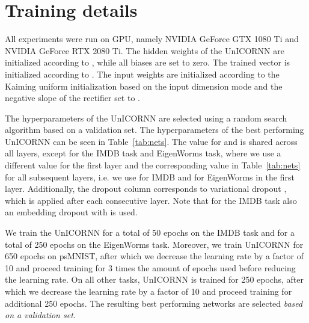 \documentclass{article}
\newcommand{\Tref}[1]{Table~\ref{#1}}
\begin{document}
\onecolumn
{}
\appendix

\setcounter{equation}{0}
\section{Training details}
All experiments were run on GPU, namely NVIDIA GeForce GTX 1080 Ti and NVIDIA GeForce RTX 2080 Ti. The hidden weights  of the UnICORNN are initialized according to  , while all biases are set to zero. The trained vector  is initialized according to . The input weights  are initialized according to the Kaiming uniform initialization \citep{kaiming} based on the input dimension mode and the negative slope of the rectifier set to .

The hyperparameters of the UnICORNN are selected using a random search algorithm based on a validation set. The hyperparameters of the best performing UnICORNN can be seen in \Tref{tab:nets}. The value for  and  is shared across all layers, except for the IMDB task and EigenWorms task, where we use a different  value for the first layer and the corresponding  value in \Tref{tab:nets} for all subsequent layers, i.e. we use  for IMDB and  for EigenWorms in the first layer. 
Additionally, the dropout column corresponds to variational dropout \citep{gal}, which is applied after each consecutive layer. Note that for the IMDB task also an embedding dropout with  is used.

We train the UnICORNN for a total of 50 epochs on the IMDB task and for a total of 250 epochs on the EigenWorms task. Moreover, we train UnICORNN for 650 epochs on psMNIST, after which we decrease the learning rate by a factor of 10 and proceed training for 3 times the amount of epochs used before reducing the learning rate. On all other tasks, UnICORNN is trained for 250 epochs, after which we decrease the learning rate by a factor of 10 and proceed training for additional 250 epochs.
The resulting best performing networks are selected \emph{based on a validation set}.
\end{document}
